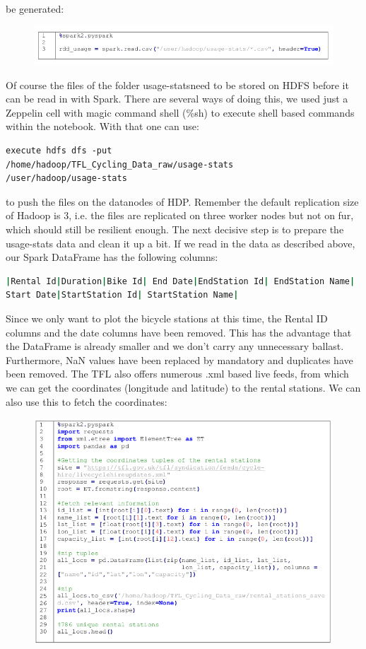 be generated:
\begin{figure}[H]
\hspace{-0.8cm}
\includegraphics[width=1.1\textwidth]{img/spark1}\label{pic:spark1}
\end{figure}
\noindent Of course the files of the folder \glqq usage-stats\grqq need to be stored on HDFS before it can be read in with Spark. There are several ways of doing this, we used just a Zeppelin cell with magic command shell (\%sh) to execute shell based commands within the notebook. With that one can use:
\begin{lstlisting}[breaklines=true]
execute hdfs dfs -put
/home/hadoop/TFL_Cycling_Data_raw/usage-stats
/user/hadoop/usage-stats
\end{lstlisting}
to push the files on the datanodes of HDP. Remember the default replication size of Hadoop is 3, i.e. the
files are replicated on three worker nodes but not on fur, which should still be resilient enough.
The next decisive step is to prepare the usage-stats data and clean it up a bit. If we read in the data as
described above, our Spark DataFrame has the following columns:
\begin{lstlisting}[language=bash,breaklines=true]
|Rental Id|Duration|Bike Id| End Date|EndStation Id| EndStation Name|
Start Date|StartStation Id| StartStation Name|
\end{lstlisting}
Since we only want to plot the bicycle stations at this time, the Rental ID columns and the date columns
have been removed. This has the advantage that the DataFrame is already smaller and we don't carry any
unnecessary ballast. Furthermore, NaN values have been replaced by mandatory \grqq and duplicates have been removed. The TFL also offers numerous .xml based live feeds, from which we can get the coordinates (longitude and latitude) to the rental stations. We can also use this to fetch the coordinates:
\begin{figure}[H]
\hspace{-0.8cm}
\includegraphics[width=1.1\textwidth]{img/spark2}\label{pic:spark2}
\end{figure}

